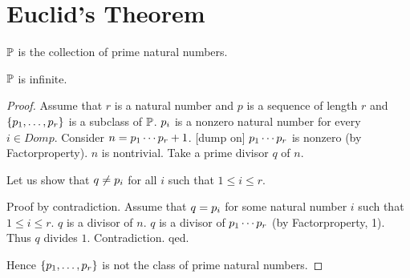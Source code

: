\documentclass[11pt]{article}
\begin{document}
\section{Euclid's Theorem}

\begin{forthel}

\begin{signature} $\mathbb{P}$ is the collection of prime natural numbers.
\end{signature}



\begin{theorem}[Euclid]
$\mathbb{P}$ is infinite.
\end{theorem}
\begin{proof}
Assume that $r$ is a natural number and 
$p$ is a sequence of length $r$ and
$\{p_{1},\dots,p_{r}\}$ is a subclass of $\mathbb{P}$.
$p_{i}$ is a nonzero natural number for every 
$i \in  Dom p$.
Consider $n=p_{1} \cdots p_{r}+1$.
[dump on]
$p_{1} \cdots p_{r}$ is nonzero (by Factorproperty). $n$ is nontrivial.
Take a prime divisor $q$ of $n$.

Let us show that $q \neq p_{i}$ for all $i$ such that 
$1 \leq i \leq r$.
   
Proof by contradiction.
Assume that $q=p_{i}$ for some natural number $i$ such that
$1 \leq i \leq r$.
$q$ is a divisor of $n$.
$q$ is a divisor of $p_{1} \cdots p_{r}$
(by Factorproperty, 1).
Thus $q$ divides $1$. Contradiction. qed.

Hence $\{p_{1},\dots,p_{r}\}$ is not the class of prime natural numbers.
\end{proof}
\end{forthel}
\end{document}
